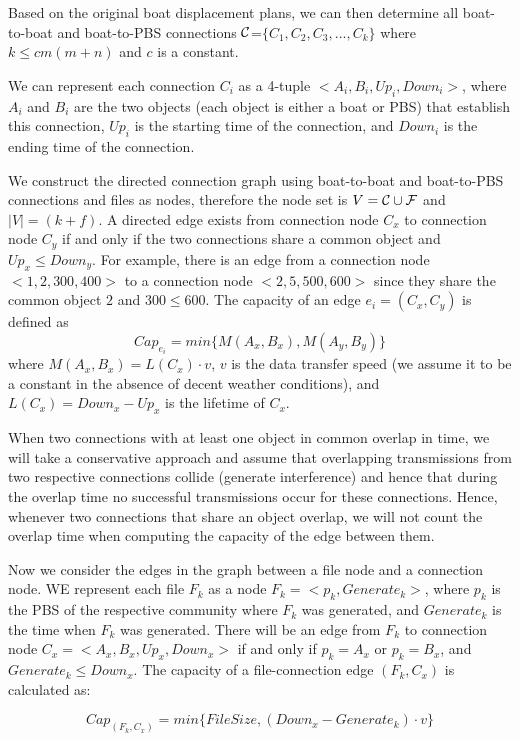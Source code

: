 \documentclass[conference]{IEEEtran}
\begin{document}
Based on the original boat displacement plans, we can then determine all boat-to-boat and boat-to-PBS connections $\cal C$=$\{C_1,C_2,C_3, ... ,C_k\}$ where $k \leq cm(m+n)$ and $c$ is a constant.

We can represent each connection $C_i$ as a 4-tuple $<A_i, B_i, Up_i, Down_i>$, where $A_i$ and $B_i$ are the two objects (each object is either a boat or PBS) that establish this connection, $Up_i$ is the starting time of the connection, and $Down_i$ is the ending time of the connection.

We construct the directed connection graph using boat-to-boat and boat-to-PBS connections and files as nodes, therefore the node set is $V = {\cal C} \cup {\cal F}$ and $|V|=(k+f)$. A directed edge exists from connection node $C_x$ to connection node $C_y$ if and only if the two connections share a common object and $Up_x \le Down_y$. For example, there is an edge from a connection node $<1, 2, 300, 400>$ to a connection node $<2, 5, 500, 600>$ since they share the common object $2$ and $300 \le 600$. The capacity of an edge $e_i=(C_x,C_y)$ is defined as
\begin{equation} \nonumber
Cap_{e_i} = min\{M(A_x,B_x),M(A_y,B_y)\}
\end{equation}
where $M(A_x,B_x) = L(C_x) \cdot v$,  $v$ is the data transfer speed (we assume it to be a constant in the absence of decent weather conditions), and $L(C_x)=Down_x-Up_x$ is the lifetime of $C_x$.

When two connections with at least one object in common overlap in time, we will take a conservative approach and assume that overlapping transmissions from  two respective connections collide (generate interference) and hence that during the overlap time no successful transmissions occur for these connections. Hence, whenever two connections that share an object overlap, we will not count the overlap time when computing the capacity of the edge between them.

Now we consider the edges in the graph between a file node and a connection node. WE represent each file $F_k$ as a node $F_k=<p_k,Generate_k>$, where $p_k$ is the PBS of the respective community where $F_k$ was generated, and $Generate_k$ is the time when $F_k$  was generated. There will be an edge from $F_k$ to connection node $C_x=<A_x, B_x, Up_x, Down_x>$ if and only if $p_k = A_x$ or $p_k = B_x$, and $Generate_k \leq Down_x$. The capacity of a file-connection edge $(F_k,C_x)$ is calculated as:

\begin{equation} \nonumber
Cap_{(F_k,C_x)} = min \{FileSize, (Down_x-Generate_k )\cdot v\}
\end{equation}
\end{document}
